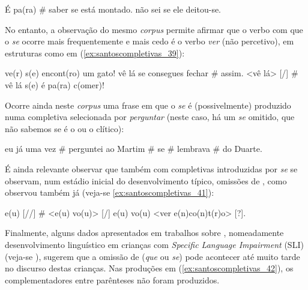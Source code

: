 \documentclass[output=paper]{LSP/langsci}
\begin{document}
\ea\label{ex:santoscompletivas_38}
\ea\label{ex:santoscompletivas_38a} É pa(ra) \# saber se está montado.
\ex\label{ex:santoscompletivas_38b} não sei se ele deitou-se.
\zl

No entanto, a observação do mesmo \textit{corpus} permite afirmar que o verbo com que o  \textit{se} ocorre mais frequentemente e mais cedo é o verbo \textit{ver} (não percetivo), em estruturas como em (\ref{ex:santoscompletivas_39}):


\ea\label{ex:santoscompletivas_39}
\ea\label{ex:santoscompletivas_39a} ve(r) s(e) encont(ro) um gato!
\ex\label{ex:santoscompletivas_39b} vê lá se consegues fechar \# assim.
\ex\label{ex:santoscompletivas_39c} <vê lá> [/] \# vê lá s(e) é pa(ra) c(omer)!
\zl

Ocorre ainda neste \textit{corpus} uma frase em que o  \textit{se} é (possivelmente) produzido numa completiva selecionada por \textit{perguntar} (neste caso, há um \textit{se} omitido, que não sabemos se é o  ou o clítico):

\ea\label{ex:santoscompletivas_40}
eu já uma vez \# perguntei ao Martim \# se \# lembrava \# do Duarte. 
\z

É ainda relevante observar que também com completivas introduzidas por \textit{se} se observam, num estádio inicial do desenvolvimento típico, omissões de , como observou também já \citet{soares2006} (veja-se \ref{ex:santoscompletivas_41}):

\ea\label{ex:santoscompletivas_41} e(u) [//] \# <e(u) vo(u)> [/] e(u) vo(u) <ver e(n)co(n)t(r)o> [?].\\
\z

Finalmente, alguns dados apresentados em trabalhos sobre , nomeadamente desenvolvimento linguístico em crianças com \textit{Specific Language Impairment} (SLI) (veja-se \citealt{kay1997}), sugerem que a omissão de  (\textit{que} ou \textit{se}) pode acontecer até muito tarde no discurso destas crianças. Nas produções em (\ref{ex:santoscompletivas_42}), os complementadores entre parênteses não foram produzidos.
\end{document}
